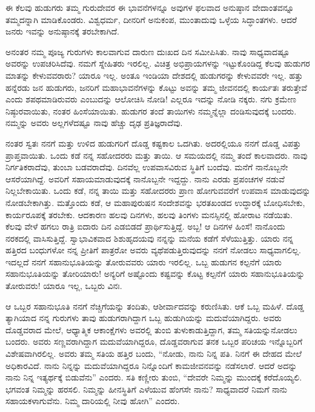 ಈ ಕೆಲವು ಹುಡುಗರು ತಮ್ಮ ಗುರುದೇವರ ಈ ಭಾವನೆಗಳನ್ನೂ ಅವುಗಳ ಫಲವಾದ ಅನುಷ್ಠಾನ ವೇದಾಂತವನ್ನೂ ತಮ್ಮದನ್ನಾಗಿ ಮಾಡಿಕೊಂಡರು. ವಿಶ್ವಧರ್ಮ, ದೀನರಿಗೆ ಅನುಕಂಪ, ಮುಂತಾದುವು ಒಳ್ಳೆಯ ಸಿದ್ಧಾಂತಗಳು. ಆದರೆ ಜನರು ಇವನ್ನು ಅನುಷ್ಠಾನಕ್ಕೆ ತರಬೇಕಾಗಿದೆ.

ಅನಂತರ ನಮ್ಮ ಪೂಜ್ಯ ಗುರುಗಳು ಕಾಲವಾಗುವ ದಾರುಣ ದುಃಖದ ದಿನ ಸಮೀಪಿಸಿತು. ನಾವು ಸಾಧ್ಯವಾದಷ್ಟೂ ಅವರನ್ನು ಉಪಚರಿಸಿದೆವು. ನಮಗೆ ಸ್ನೇಹಿತರು ಇರಲಿಲ್ಲ. ವಿಚಿತ್ರ ಅಭಿಪ್ರಾಯಗಳನ್ನು ಇಟ್ಟುಕೊಂಡಿದ್ದ ಕೆಲವು ಹುಡುಗರ ಮಾತನ್ನು ಕೇಳುವವರಾರು? ಯಾರೂ ಇಲ್ಲ. ಅಂತೂ ಇಂಡಿಯಾ ದೇಶದಲ್ಲಿ ಹುಡುಗರನ್ನು ಕೇಳುವವರೇ ಇಲ್ಲ. ಹತ್ತು ಹನ್ನೆರಡು ಜನ ಹುಡುಗರು, ಜನರಿಗೆ ಮಹಾಭಾವನೆಗಳನ್ನು ಕೊಟ್ಟು ಅವನ್ನು ತಮ್ಮ ಜೀವನದಲ್ಲಿ ಕಾರ್ಯತಃ ತರುತ್ತೇವೆ ಎಂದು ಶಪಥಮಾಡಿರುವರು ಎಂಬುದನ್ನು ಆಲೋಚಿಸಿ ನೋಡಿ! ಎಲ್ಲರೂ ಇದನ್ನು ನೋಡಿ ನಕ್ಕರು. ನಗು ಕ್ರಮೇಣ ನಿಷ್ಠುರವಾಯಿತು, ನಂತರ ಹಿಂಸೆಯಾಯಿತು. ಹುಡುಗರ ತಂದೆ ತಾಯಿಗಳು ನಮ್ಮನ್ನೆಲ್ಲಾ ದಂಡಿಸುವುದಕ್ಕೆ ಬಂದರು. ನಮ್ಮನ್ನು ಅವರು ಅಲ್ಲಗಳೆದಷ್ಟೂ ನಾವು ಹೆಚ್ಚು ದೃಢ ಪ್ರತಿಜ್ಞರಾದೆವು.

ನಂತರ ಸ್ವತಃ ನನಗೆ ಮತ್ತು ಉಳಿದ ಹುಡುಗರಿಗೆ ದೊಡ್ಡ ಕಷ್ಟಕಾಲ ಒದಗಿತು. ಅದರಲ್ಲಿಯೂ ನನಗೆ ದೊಡ್ಡ ವಿಪತ್ತು ಪ್ರಾಪ್ತವಾಯಿತು. ಒಂದು ಕಡೆ ನನ್ನ ಸಹೋದರರು ಮತ್ತು ತಾಯಿ. ಆ ಸಮಯದಲ್ಲಿ ನಮ್ಮ ತಂದೆ ಕಾಲವಾದರು. ನಾವು ನಿರ್ಗತಿಕರಾದೆವು, ತುಂಬಾ ಬಡವರಾದೆವು. ದಿನವೆಲ್ಲ ಉಪವಾಸವಿರುವ ಸ್ಥಿತಿಗೆ ಬಂದೆವು. ಮನೆಗೆ ನಾನೊಬ್ಬನೇ ಆಸರೆಯಾಗಿದ್ದೆ. ಅವರಿಗೆ ಸಹಾಯಮಾಡುವುದಕ್ಕೆ ನಾನೊಬ್ಬನೇ ಇದ್ದದ್ದು. ನಾನು ಎರಡು ಪ್ರಪಂಚಗಳ ನಡುವೆ ನಿಲ್ಲಬೇಕಾಯಿತು. ಒಂದು ಕಡೆ, ನನ್ನ ತಾಯಿ ಮತ್ತು ಸಹೋದರರು ಪ್ರಾಣ ಹೋಗುವವರೆಗೆ ಉಪವಾಸ ಮಾಡುವುದನ್ನು ನೋಡಬೇಕಾಗಿತ್ತು. ಮತ್ತೊಂದು ಕಡೆ, ಆ ಮಹಾಪುರುಷನ ಸಂದೇಶವನ್ನು ಭರತಖಂಡದ ಉದ್ಧಾರಕ್ಕೆ ಬೋಧಿಸಬೇಕು, ಕಾರ್ಯರೂಪಕ್ಕೆ ತರಬೇಕು. ಆದಕಾರಣ ಹಲವು ದಿನಗಳು, ಹಲವು ತಿಂಗಳು ಮನಸ್ಸಿನಲ್ಲಿ ಹೋರಾಟ ನಡೆಯಿತು. ಕೆಲವು ವೇಳೆ ಹಗಲು ರಾತ್ರಿ ಐದಾರು ದಿನ ಎಡಬಿಡದೆ ಪ್ರಾರ್ಥಿಸುತ್ತಿದ್ದೆ. ಅಬ್ಬ! ಆ ದಿನಗಳ ಹಿಂಸೆ! ನಾನೊಂದು ನರಕದಲ್ಲಿ ವಾಸಿಸುತ್ತಿದ್ದೆ. ಸ್ವಾಭಾವಿಕವಾದ ಶಿಶುಹೃದಯವು ನನ್ನನ್ನು ಮನೆಯ ಕಡೆಗೆ ಸೆಳೆಯುತ್ತಿತ್ತು. ಯಾರು ನನ್ನ ಹತ್ತಿರದ ಬಂಧುಗಳೋ ನನ್ನ ಪ್ರೀತಿಗೆ ಪಾತ್ರರೋ ಅವರು ವ್ಯಥೆಪಡುತ್ತಿರುವುದನ್ನು ನನಗೆ ನೋಡಲು ಸಾಧ್ಯವಾಗಲಿಲ್ಲ. ಇದಲ್ಲದೆ ನನಗೆ ಸಹಾನುಭೂತಿಯನ್ನು ತೋರುವವರು ಯಾರು ಇರಲಿಲ್ಲ. ಒಬ್ಬ ಹುಡುಗನ ಕಲ್ಪನೆಗೆ ಯಾರು ಸಹಾನುಭೂತಿಯನ್ನು ತೋರಿಯಾರು! ಅನ್ಯರಿಗೆ ಅಷ್ಟೊಂದು ಕಷ್ಟವನ್ನು ಕೊಟ್ಟ ಕಲ್ಪನೆಗೆ ಯಾರು ಸಹಾನುಭೂತಿಯನ್ನು ತೋರುವರು! ಯಾರೂ ಇಲ್ಲ, ಒಬ್ಬರು ವಿನಃ.

ಆ ಒಬ್ಬರ ಸಹಾನುಭೂತಿ ನನಗೆ ನೆಚ್ಚಿಗೆಯನ್ನು ತಂದಿತು, ಆಶೀರ್ವಾದವನ್ನು ಕರುಣಿಸಿತು. ಆಕೆ ಒಬ್ಬ ಮಹಿಳೆ. ದೊಡ್ಡ ತ್ಯಾಗಿಯಾದ ನನ್ನ ಗುರುಗಳು ತಾವು ಹುಡುಗರಾಗಿದ್ದಾಗ ಒಬ್ಬ ಹುಡುಗಿಯನ್ನು ಮದುವೆಯಾಗಿದ್ದರು. ಅವರು ದೊಡ್ಡವರಾದ ಮೇಲೆ, ಆಧ್ಯಾತ್ಮಿಕ ಆಕಾಂಕ್ಷೆಗಳು ಅವರಲ್ಲಿ ತುಂಬಿ ತುಳುಕಾಡುತ್ತಿದ್ದಾಗ, ತಮ್ಮ ಸತಿಯನ್ನು\break ನೋಡಲು ಬಂದರು. ಅವರು ಸಣ್ಣವರಾಗಿದ್ದಾಗ ಮದುವೆಯಾಗಿದ್ದರೂ, ದೊಡ್ಡವರಾಗುವ ತನಕ ಒಬ್ಬರ ಪರಿಚಯ ಇನ್ನೊಬ್ಬರಿಗೆ ವಿಶೇಷವಾಗಿರಲಿಲ್ಲ. ಅವರು ತಮ್ಮ ಸತಿಯ ಹತ್ತಿರ ಬಂದು, “ನೋಡು, ನಾನು ನಿನ್ನ ಪತಿ. ನಿನಗೆ ಈ ದೇಹದ ಮೇಲೆ ಅಧಿಕಾರವಿದೆ. ನಾನು ನಿನ್ನನ್ನು ಮದುವೆಯಾಗಿದ್ದರೂ ನಿನ್ನೊಂದಿಗೆ ಕಾಮಜೀವನವನ್ನು ನಡೆಸಲಾರೆ. ಆದರೆ ಅದನ್ನು ನಾನು ನಿನ್ನ ಇತ್ಯರ್ಥಕ್ಕೆ ಬಿಡುವೆನು'' ಎಂದರು. ಸತಿ ಕಣ್ಣೀರು ತುಂಬಿ, “ದೇವರೇ ನಿಮ್ಮನ್ನು ಮುಂದಕ್ಕೆ ಕರೆದೊಯ್ಯಲಿ. ಭಗವಂತ ನಿಮ್ಮನ್ನು ಹರಸಲಿ. ನಿಮ್ಮನ್ನು ಹೀನಸ್ಥಿತಿಗೆ ಎಳೆಯುವ ಹೆಂಗಸೇ ನಾನು? ಸಾಧ್ಯವಾದರೆ ನಿಮಗೆ ನಾನು ಸಹಾಯಕಳಾಗುವೆನು. ನಿಮ್ಮ ದಾರಿಯಲ್ಲಿ ನೀವು ಹೋಗಿ” ಎಂದರು.


